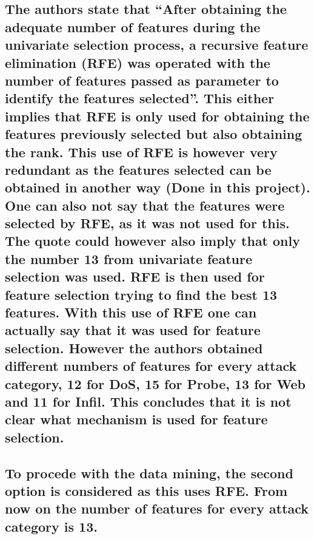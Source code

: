 \documentclass[11pt]{article}
\begin{document}
{\subsection{The authors state that ``After obtaining the adequate number
of features during the univariate selection process, a recursive feature
elimination (RFE) was operated with the number of features passed as
parameter to identify the features selected''. This either implies that
RFE is only used for obtaining the features previously selected but also
obtaining the rank. This use of RFE is however very redundant as the
features selected can be obtained in another way (Done in this project).
One can also not say that the features were selected by RFE, as it was
not used for this. The quote could however also imply that only the
number 13 from univariate feature selection was used. RFE is then used
for feature selection trying to find the best 13 features. With this use
of RFE one can actually say that it was used for feature selection.
However the authors obtained different numbers of features for every
attack category, 12 for DoS, 15 for Probe, 13 for Web and 11 for Infil.
This concludes that it is not clear what mechanism is used for feature
selection.}\label{the-authors-state-that-after-obtaining-the-adequate-number-of-features-during-the-univariate-selection-process-a-recursive-feature-elimination-rfe-was-operated-with-the-number-of-features-passed-as-parameter-to-identify-the-features-selected.-this-either-implies-that-rfe-is-only-used-for-obtaining-the-features-previously-selected-but-also-obtaining-the-rank.-this-use-of-rfe-is-however-very-redundant-as-the-features-selected-can-be-obtained-in-another-way-done-in-this-project.-one-can-also-not-say-that-the-features-were-selected-by-rfe-as-it-was-not-used-for-this.-the-quote-could-however-also-imply-that-only-the-number-13-from-univariate-feature-selection-was-used.-rfe-is-then-used-for-feature-selection-trying-to-find-the-best-13-features.-with-this-use-of-rfe-one-can-actually-say-that-it-was-used-for-feature-selection.-however-the-authors-obtained-different-numbers-of-features-for-every-attack-category-12-for-dos-15-for-probe-13-for-web-and-11-for-infil.-this-concludes-that-it-is-not-clear-what-mechanism-is-used-for-feature-selection.}}

\hypertarget{to-procede-with-the-data-mining-the-second-option-is-considered-as-this-uses-rfe.-from-now-on-the-number-of-features-for-every-attack-category-is-13.}{%
\subsection{To procede with the data mining, the second option is
considered as this uses RFE. From now on the number of features for
every attack category is
13.}\label{to-procede-with-the-data-mining-the-second-option-is-considered-as-this-uses-rfe.-from-now-on-the-number-of-features-for-every-attack-category-is-13.}}
\end{document}
